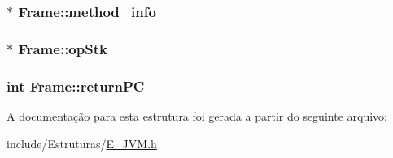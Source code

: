 \subsubsection[{method\+\_\+info}]{$\ast$ Frame\+::method\+\_\+info}\label{struct_frame_a4dbf8107ea01f748582bb060aa299628}
\hypertarget{struct_frame_a0cd2446df36707c236ffaf43844d387a}{}
\subsubsection[{op\+Stk}]{$\ast$ Frame\+::op\+Stk}\label{struct_frame_a0cd2446df36707c236ffaf43844d387a}
\hypertarget{struct_frame_a0f431de4c352b8c9a170a8e74d7c3a15}{}
\subsubsection[{return\+P\+C}]{\setlength{\rightskip}{0pt plus 5cm}int Frame\+::return\+P\+C}\label{struct_frame_a0f431de4c352b8c9a170a8e74d7c3a15}


A documentação para esta estrutura foi gerada a partir do seguinte arquivo\+:\begin{DoxyCompactItemize}
\item 
include/\+Estruturas/\hyperlink{_e___j_v_m_8h}{E\+\_\+\+J\+V\+M.\+h}\end{DoxyCompactItemize}
